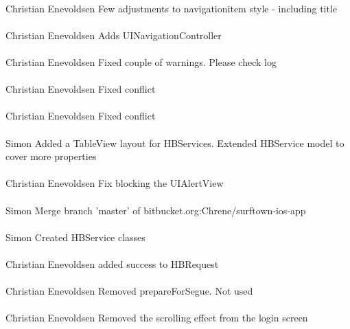 \documentclass[12pt]{article}
\begin{document}
\paragraph{}Christian Enevoldsen	Few adjustments to navigationitem style - including title
\paragraph{}Christian Enevoldsen	Adds UINavigationController
\paragraph{}Christian Enevoldsen	Fixed couple of warnings. Please check log
\paragraph{}Christian Enevoldsen	Fixed conflict
\paragraph{}Christian Enevoldsen	Fixed conflict
\paragraph{}Simon	Added a TableView layout for HBServices. Extended HBService model to cover more properties
\paragraph{}Christian Enevoldsen	Fix blocking the UIAlertView
\paragraph{}Simon	Merge branch 'master' of bitbucket.org:Chrene/surftown-ios-app
\paragraph{}Simon	Created HBService classes
\paragraph{}Christian Enevoldsen	added success to HBRequest
\paragraph{}Christian Enevoldsen	Removed prepareForSegue. Not used
\paragraph{}Christian Enevoldsen	Removed the scrolling effect from the login screen
\end{document}
